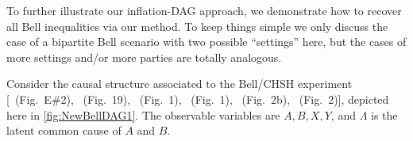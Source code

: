 {

To further illustrate our inflation-DAG approach, we demonstrate how to recover all Bell inequalities \cite{Brunner2013Bell,bell1966lhvm,CHSHOriginal} via our method. To keep things simple we only discuss the case of a bipartite Bell scenario with two possible ``settings'' here, but the cases of more settings and/or more parties are totally analogous.

Consider the causal structure associated to the Bell/CHSH \cite{bell1964einstein,Brunner2013Bell,bell1966lhvm,CHSHOriginal} experiment [\citealp{pusey2014gdag}~(Fig.~E\#2), \citealp{WoodSpekkens}~(Fig.~19), \citealp{chaves2014novel}~(Fig.~1), \citealp{BeyondBellII}~(Fig.~1), \citealp{wolfe2015nonconvexity}~(Fig.~2b), \citealp{steeg2011relaxation}~(Fig.~2)], depicted here in \cref{fig:NewBellDAG1}. The observable variables are $A,B,X,Y$, and $\Lambda$ is the latent common cause of $A$ and $B$.

}
